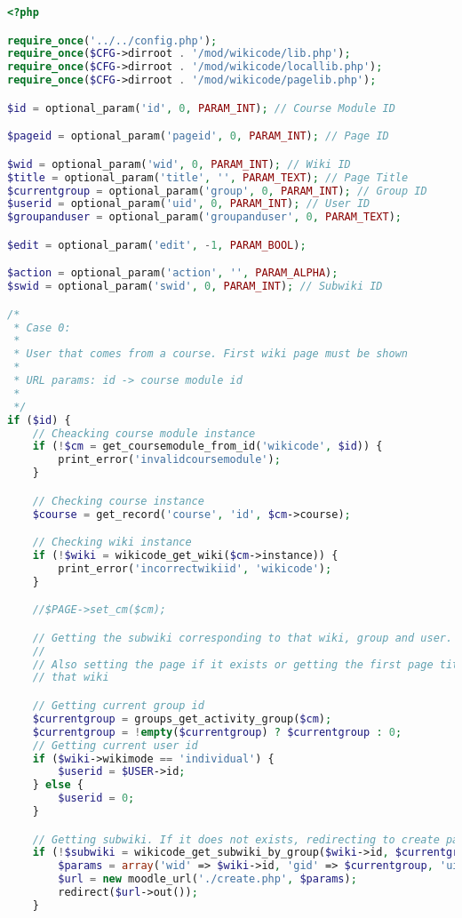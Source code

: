 \begin{lstlisting}[language=PHP]
<?php

require_once('../../config.php');
require_once($CFG->dirroot . '/mod/wikicode/lib.php');
require_once($CFG->dirroot . '/mod/wikicode/locallib.php');
require_once($CFG->dirroot . '/mod/wikicode/pagelib.php');

$id = optional_param('id', 0, PARAM_INT); // Course Module ID

$pageid = optional_param('pageid', 0, PARAM_INT); // Page ID

$wid = optional_param('wid', 0, PARAM_INT); // Wiki ID
$title = optional_param('title', '', PARAM_TEXT); // Page Title
$currentgroup = optional_param('group', 0, PARAM_INT); // Group ID
$userid = optional_param('uid', 0, PARAM_INT); // User ID
$groupanduser = optional_param('groupanduser', 0, PARAM_TEXT);

$edit = optional_param('edit', -1, PARAM_BOOL);

$action = optional_param('action', '', PARAM_ALPHA);
$swid = optional_param('swid', 0, PARAM_INT); // Subwiki ID

/*
 * Case 0:
 *
 * User that comes from a course. First wiki page must be shown
 *
 * URL params: id -> course module id
 *
 */
if ($id) {
    // Cheacking course module instance
    if (!$cm = get_coursemodule_from_id('wikicode', $id)) {
        print_error('invalidcoursemodule');
    }

    // Checking course instance
    $course = get_record('course', 'id', $cm->course);

    // Checking wiki instance
    if (!$wiki = wikicode_get_wiki($cm->instance)) {
        print_error('incorrectwikiid', 'wikicode');
    }

    //$PAGE->set_cm($cm);

    // Getting the subwiki corresponding to that wiki, group and user.
    //
    // Also setting the page if it exists or getting the first page title form
    // that wiki

    // Getting current group id
    $currentgroup = groups_get_activity_group($cm);
    $currentgroup = !empty($currentgroup) ? $currentgroup : 0;
    // Getting current user id
    if ($wiki->wikimode == 'individual') {
        $userid = $USER->id;
    } else {
        $userid = 0;
    }

    // Getting subwiki. If it does not exists, redirecting to create page
    if (!$subwiki = wikicode_get_subwiki_by_group($wiki->id, $currentgroup, $userid)) {
        $params = array('wid' => $wiki->id, 'gid' => $currentgroup, 'uid' => $userid, 'title' => $wiki->firstpagetitle);	
        $url = new moodle_url('./create.php', $params);
        redirect($url->out());
    }


\end{lstlisting}
